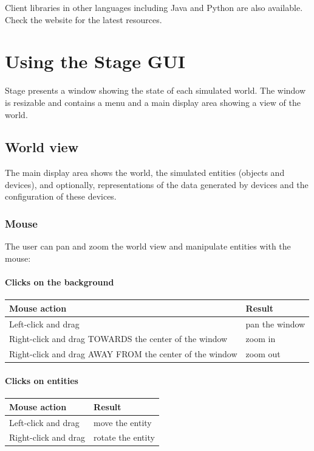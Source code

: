 \documentclass[letter,11pt,twoside]{report}
\begin{document}
Client libraries in other languages including Java and Python are also
available. Check the website for the latest resources.


\chapter{Using the Stage GUI}

Stage presents a window showing the state of each simulated world. The
window is resizable and contains a menu and a main display area
showing a view of the world.

\section{World view}
The main display area shows the world, the simulated entities (objects
and devices), and optionally, representations of the data generated by
devices and the configuration of these devices.

\subsection{Mouse}
The user can pan and zoom the world view and manipulate entities with
the mouse:

\subsubsection*{Clicks on the background}

\begin{tabular}{|l|l|}
\hline Mouse action & Result\\\hline
Left-click and drag & pan the window\\
Right-click and drag TOWARDS the center of the window & zoom in\\
Right-click and drag AWAY FROM the center of the window & zoom out\\ 
\hline
\end{tabular}

\subsubsection*{Clicks on entities}
\begin{tabular}{|l|l|}
\hline Mouse action & Result\\\hline
Left-click and drag & move the entity\\
Right-click and drag & rotate the entity\\
\hline
\end{tabular}
\end{document}
